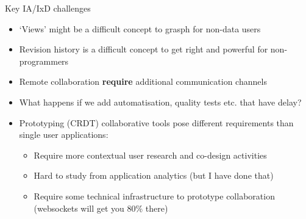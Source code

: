 \documentclass[aspectratio=169]{beamer}
\begin{document}
\begin{frame}{Key IA/IxD challenges}
    \begin{itemize}
        \small
        \item `Views' might be a difficult concept to grasph for non-data users
        \item Revision history is a difficult concept to get right and powerful for non-programmers
        \item Remote collaboration \textbf{require} additional communication channels
        \item What happens if we add automatisation, quality tests etc. that have delay?
        \item Prototyping (CRDT) collaborative tools pose different requirements than single user applications:
        \begin{itemize}
            \footnotesize
            \item Require more contextual user research and co-design activities
            \item Hard to study from application analytics (but I have done that)
            \item Require some technical infrastructure to prototype collaboration (websockets will get you 80\% there)
        \end{itemize}
    \end{itemize}
\end{frame}
\end{document}
